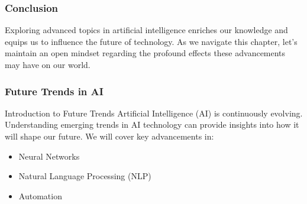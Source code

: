 \documentclass[aspectratio=169]{beamer}
\begin{document}
\begin{frame}[fragile]
    \frametitle{Conclusion}
    Exploring advanced topics in artificial intelligence enriches our knowledge and equips us to influence the future of technology. As we navigate this chapter, let’s maintain an open mindset regarding the profound effects these advancements may have on our world.
\end{frame}

\begin{frame}[fragile]
    \frametitle{Future Trends in AI}
    \begin{block}{Introduction to Future Trends}
        Artificial Intelligence (AI) is continuously evolving. Understanding emerging trends in AI technology can provide insights into how it will shape our future. We will cover key advancements in:
        \begin{itemize}
            \item Neural Networks
            \item Natural Language Processing (NLP)
            \item Automation
        \end{itemize}
    \end{block}
\end{frame}
\end{document}
